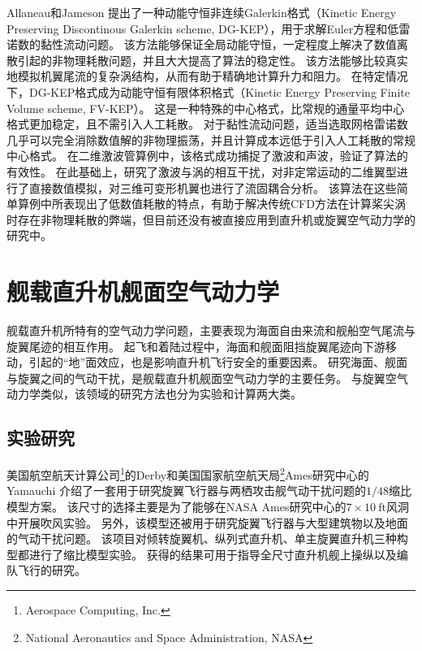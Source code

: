 \documentclass[doctor,openright,twoside,color]{buaathesis}
\begin{document}
Allaneau和Jameson
提出了一种动能守恒非连续Galerkin格式（Kinetic Energy Preserving Discontinous Galerkin scheme, DG-KEP），用于求解Euler方程和低雷诺数的黏性流动问题。
该方法能够保证全局动能守恒，一定程度上解决了数值离散引起的非物理耗散问题，并且大大提高了算法的稳定性。
该方法能够比较真实地模拟机翼尾流的复杂涡结构，从而有助于精确地计算升力和阻力。
在特定情况下，DG-KEP格式成为动能守恒有限体积格式（Kinetic Energy Preserving Finite Volume scheme, FV-KEP）。
这是一种特殊的中心格式，比常规的通量平均中心格式更加稳定，且不需引入人工耗散。
对于黏性流动问题，适当选取网格雷诺数几乎可以完全消除数值解的非物理振荡，并且计算成本远低于引入人工耗散的常规中心格式。
在二维激波管算例中，该格式成功捕捉了激波和声波，验证了算法的有效性。
在此基础上，研究了激波与涡的相互干扰，对非定常运动的二维翼型进行了直接数值模拟，对三维可变形机翼也进行了流固耦合分析。
该算法在这些简单算例中所表现出了低数值耗散的特点，有助于解决传统CFD方法在计算桨尖涡时存在非物理耗散的弊端，但目前还没有被直接应用到直升机或旋翼空气动力学的研究中。


\section{舰载直升机舰面空气动力学}
舰载直升机所特有的空气动力学问题，主要表现为海面自由来流和舰船空气尾流与旋翼尾迹的相互作用。
起飞和着陆过程中，海面和舰面阻挡旋翼尾迹向下游移动，引起的“地”面效应，也是影响直升机飞行安全的重要因素。
研究海面、舰面与旋翼之间的气动干扰，是舰载直升机舰面空气动力学的主要任务。
与旋翼空气动力学类似，该领域的研究方法也分为实验和计算两大类。

\subsection{实验研究}
美国航空航天计算公司\footnote{Aerospace Computing, Inc.}的Derby和美国国家航空航天局\footnote{National Aeronautics and Space Administration, NASA}Ames研究中心的Yamauchi
介绍了一套用于研究旋翼飞行器与两栖攻击舰气动干扰问题的$1/48$缩比模型方案。
该尺寸的选择主要是为了能够在NASA Ames研究中心的$7\times10~\mathrm{ft}$风洞中开展吹风实验。
另外，该模型还被用于研究旋翼飞行器与大型建筑物以及地面的气动干扰问题。
该项目对倾转旋翼机、纵列式直升机、单主旋翼直升机三种构型都进行了缩比模型实验。
获得的结果可用于指导全尺寸直升机舰上操纵以及编队飞行的研究。
\end{document}
